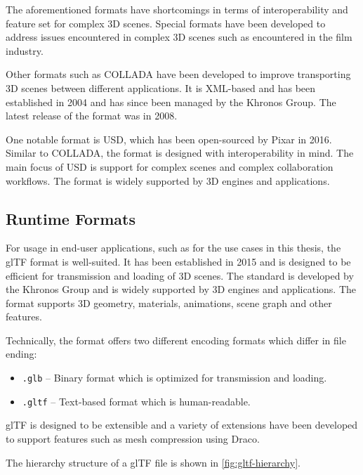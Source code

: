 The aforementioned formats have shortcomings in terms of interoperability and feature set for complex 3D scenes. Special formats have been developed to address issues encountered in complex 3D scenes such as encountered in the film industry.

Other formats such as COLLADA have been developed to improve transporting 3D scenes between different applications. It is XML-based and has been established in 2004 and has since been managed by the \gls{Khronos Group}. The latest release of the format was in 2008.

One notable format is USD, which has been open-sourced by Pixar in 2016. Similar to COLLADA, the format is designed with interoperability in mind. The main focus of USD is support for complex scenes and complex collaboration workflows. The format is widely supported by 3D engines and applications.

\subsection{Runtime Formats}

For usage in end-user applications, such as for the use cases in this thesis, the \gls{glTF} format is well-suited. It has been established in 2015 and is designed to be efficient for transmission and loading of 3D scenes. The standard is developed by the \gls{Khronos Group} and is widely supported by 3D engines and applications. The format supports 3D geometry, materials, animations, scene graph and other features.

Technically, the format offers two different encoding formats which differ in file ending:

\begin{itemize}
    \item{\texttt{.glb}} – Binary format which is optimized for transmission and loading.
    \item{\texttt{.gltf}} – Text-based format which is human-readable.
\end{itemize}

\gls{glTF} is designed to be extensible and a variety of extensions have been developed to support features such as mesh compression using Draco.

The hierarchy structure of a \gls{glTF} file is shown in \autoref{fig:gltf-hierarchy}.

